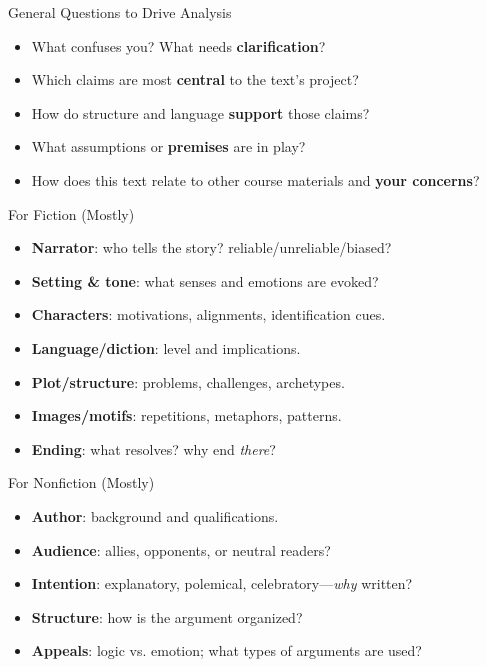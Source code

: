 \documentclass[aspectratio=169]{beamer}
\begin{document}
\begin{frame}{General Questions to Drive Analysis}
\begin{itemize}
  \item What confuses you? What needs \textbf{clarification}?
  \item Which claims are most \textbf{central} to the text’s project?
  \item How do structure and language \textbf{support} those claims?
  \item What assumptions or \textbf{premises} are in play?
  \item How does this text relate to other course materials and \textbf{your concerns}?
\end{itemize}
\end{frame}

\begin{frame}{For Fiction (Mostly)}
\begin{itemize}
  \item \textbf{Narrator}: who tells the story? reliable/unreliable/biased?
  \item \textbf{Setting \& tone}: what senses and emotions are evoked?
  \item \textbf{Characters}: motivations, alignments, identification cues.
  \item \textbf{Language/diction}: level and implications.
  \item \textbf{Plot/structure}: problems, challenges, archetypes.
  \item \textbf{Images/motifs}: repetitions, metaphors, patterns.
  \item \textbf{Ending}: what resolves? why end \emph{there}?
\end{itemize}
\end{frame}

\begin{frame}{For Nonfiction (Mostly)}
\begin{itemize}
  \item \textbf{Author}: background and qualifications.
  \item \textbf{Audience}: allies, opponents, or neutral readers?
  \item \textbf{Intention}: explanatory, polemical, celebratory—\emph{why} written?
  \item \textbf{Structure}: how is the argument organized?
  \item \textbf{Appeals}: logic vs. emotion; what types of arguments are used?
\end{itemize}
\end{frame}
\end{document}
